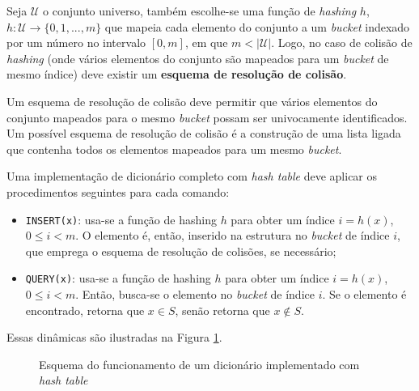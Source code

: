 \documentclass[12pt,twoside,english,brazilian]{book}
\begin{document}
Seja $\mathcal{U}$ o conjunto universo, também escolhe-se uma função de \textit{hashing} $h$, $h: \mathcal{U} \xrightarrow{} \{0,1,...,m\}$ que mapeia cada elemento do conjunto a um \textit{bucket} indexado por um número no intervalo $[0,m]$, em que $m < |\mathcal{U}|$. Logo, no caso de colisão de \textit{hashing} (onde vários elementos do conjunto são mapeados para um \textit{bucket} de mesmo índice) deve existir um \textbf{esquema de resolução de colisão}.

Um esquema de resolução de colisão deve permitir que vários elementos do conjunto mapeados para o mesmo \textit{bucket} possam ser univocamente identificados. Um possível esquema de resolução de colisão é a construção de uma lista ligada que contenha todos os elementos mapeados para um mesmo \textit{bucket}.

Uma implementação de dicionário completo com \textit{hash table} deve aplicar os procedimentos seguintes para cada comando:
\begin{itemize}
    \item \texttt{INSERT(x)}: usa-se a função de hashing $h$ para obter um índice $i = h(x)$, $0 \leq i < m$. O elemento é, então, inserido na estrutura no \textit{bucket} de índice $i$, que emprega o esquema de resolução de colisões, se necessário;
    \item \texttt{QUERY(x)}: usa-se a função de hashing $h$ para obter um índice $i = h(x)$, $0 \leq i < m$. Então, busca-se o elemento no \textit{bucket} de índice $i$. Se o elemento é encontrado, retorna que $x \in S$, senão retorna que $x \notin S$.
\end{itemize}

Essas dinâmicas são ilustradas na Figura \ref{hash-table}.

\begin{figure}
    \begin{center}
        \caption{\label{hash-table} Esquema do funcionamento de um dicionário implementado com \textit{hash table}}
    \end{center}
\end{figure}
\end{document}
